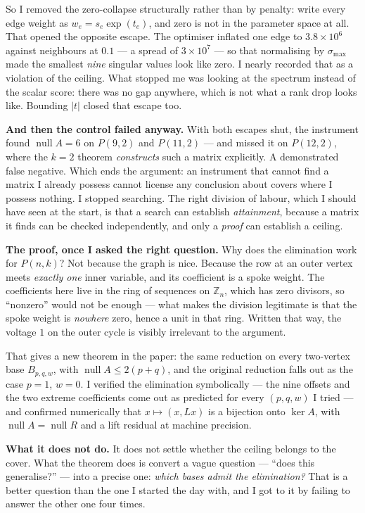 \documentclass[12pt]{article}
\begin{document}
So I removed the zero-collapse structurally rather than by penalty: write every
edge weight as $w_e=s_e\exp(t_e)$, and zero is not in the parameter space at
all. That opened the opposite escape. The optimiser inflated one edge to
$3.8\times10^{6}$ against neighbours at $0.1$ --- a spread of $3\times10^{7}$ ---
so that normalising by $\sigma_{\max}$ made the smallest \emph{nine} singular
values look like zero. I nearly recorded that as a violation of the ceiling. What
stopped me was looking at the spectrum instead of the scalar score: there was no
gap anywhere, which is not what a rank drop looks like. Bounding $|t|$ closed
that escape too.

\textbf{And then the control failed anyway.} With both escapes shut, the
instrument found $\operatorname{null}A=6$ on $P(9,2)$ and $P(11,2)$ --- and
missed it on $P(12,2)$, where the $k=2$ theorem \emph{constructs} such a
matrix explicitly. A demonstrated false negative. Which ends the argument: an
instrument that cannot find a matrix I already possess cannot license any
conclusion about covers where I possess nothing. I stopped searching. The right
division of labour, which I should have seen at the start, is that a search can
establish \emph{attainment}, because a matrix it finds can be checked
independently, and only a \emph{proof} can establish a ceiling.

\textbf{The proof, once I asked the right question.} Why does the elimination
work for $P(n,k)$? Not because the graph is nice. Because the row at an outer
vertex meets \emph{exactly one} inner variable, and its coefficient is a spoke
weight. The coefficients here live in the ring of sequences on $\mathbb Z_n$,
which has zero divisors, so ``nonzero'' would not be enough --- what makes the
division legitimate is that the spoke weight is \emph{nowhere} zero, hence a
unit in that ring. Written that way, the voltage $1$ on the outer cycle is
visibly irrelevant to the argument.

That gives a new theorem in the paper: the same reduction on every two-vertex base
$B_{p,q,w}$, with $\operatorname{null}A\le2(p+q)$, and the
original reduction falls out as the case $p=1$, $w=0$. I verified the
elimination symbolically --- the nine offsets and the two extreme coefficients
come out as predicted for every $(p,q,w)$ I tried --- and confirmed numerically
that $x\mapsto(x,Lx)$ is a bijection onto $\ker A$, with
$\operatorname{null}A=\operatorname{null}R$ and a lift residual at machine
precision.

\textbf{What it does not do.} It does not settle whether the ceiling belongs to
the cover. What the theorem does is convert a vague question --- ``does this
generalise?'' --- into a precise one: \emph{which bases admit the elimination?}
That is a better question than the one I started the day with, and I got to it by
failing to answer the other one four times.
\end{document}
